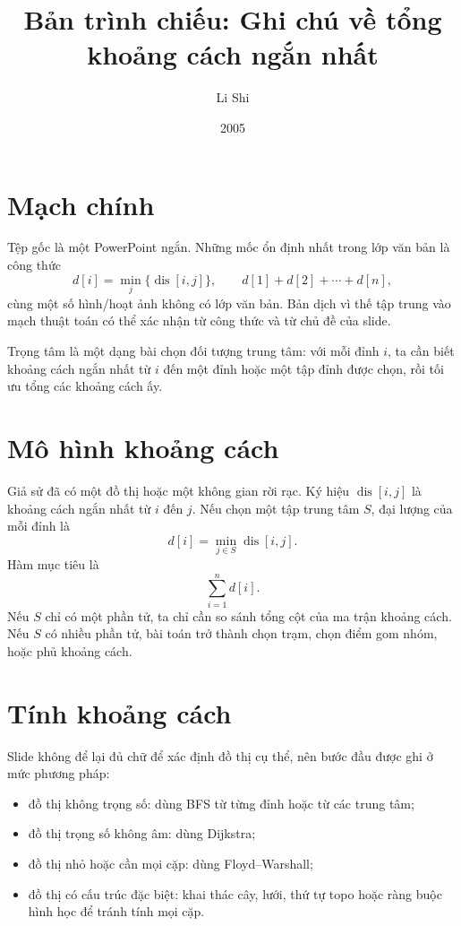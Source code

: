 \documentclass[11pt]{article}
\title{Bản trình chiếu: Ghi chú về tổng khoảng cách ngắn nhất}
\author{Li Shi}
\date{2005}
\begin{document}
\maketitle


\section{Mạch chính}

Tệp gốc là một PowerPoint ngắn. Những mốc ổn định nhất trong lớp văn bản là
công thức
\[
  d[i]=\min_j\{\operatorname{dis}[i,j]\},
  \qquad
  d[1]+d[2]+\cdots+d[n],
\]
cùng một số hình/hoạt ảnh không có lớp văn bản. Bản dịch vì thế tập trung vào
mạch thuật toán có thể xác nhận từ công thức và từ chủ đề của slide.

Trọng tâm là một dạng bài chọn đối tượng trung tâm: với mỗi đỉnh \(i\), ta cần
biết khoảng cách ngắn nhất từ \(i\) đến một đỉnh hoặc một tập đỉnh được chọn,
rồi tối ưu tổng các khoảng cách ấy.

\section{Mô hình khoảng cách}

Giả sử đã có một đồ thị hoặc một không gian rời rạc. Ký hiệu
\(\operatorname{dis}[i,j]\) là khoảng cách ngắn nhất từ \(i\) đến \(j\). Nếu
chọn một tập trung tâm \(S\), đại lượng của mỗi đỉnh là
\[
  d[i]=\min_{j\in S}\operatorname{dis}[i,j].
\]
Hàm mục tiêu là
\[
  \sum_{i=1}^n d[i].
\]
Nếu \(S\) chỉ có một phần tử, ta chỉ cần so sánh tổng cột của ma trận khoảng
cách. Nếu \(S\) có nhiều phần tử, bài toán trở thành chọn trạm, chọn điểm gom
nhóm, hoặc phủ khoảng cách.

\section{Tính khoảng cách}

Slide không để lại đủ chữ để xác định đồ thị cụ thể, nên bước đầu được ghi ở
mức phương pháp:
\begin{itemize}
  \item đồ thị không trọng số: dùng BFS từ từng đỉnh hoặc từ các trung tâm;
  \item đồ thị trọng số không âm: dùng Dijkstra;
  \item đồ thị nhỏ hoặc cần mọi cặp: dùng Floyd--Warshall;
  \item đồ thị có cấu trúc đặc biệt: khai thác cây, lưới, thứ tự topo hoặc
  ràng buộc hình học để tránh tính mọi cặp.
\end{itemize}
\end{document}
